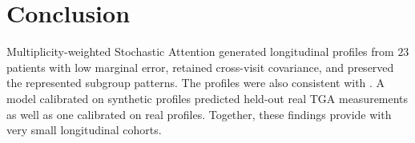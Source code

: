 \section{Conclusion}
\label{sec:conclusion}

Multiplicity-weighted Stochastic Attention generated longitudinal profiles from $23$ patients
with low marginal error, retained cross-visit covariance, and preserved the represented
subgroup patterns. The profiles were also consistent with . A model calibrated on synthetic profiles predicted held-out
real TGA measurements as well as one calibrated on real profiles.  Together, these findings provide  with very small longitudinal
cohorts.
